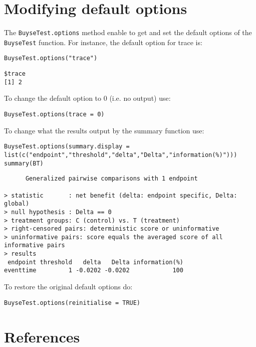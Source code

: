 \documentclass[12pt]{article}
\begin{document}
\clearpage

\section{Modifying default options}
\label{sec:org1e2e6ce}
The \texttt{BuyseTest.options} method enable to get and set the default
options of the \texttt{BuyseTest} function. For instance, the default option
for trace is:
\lstset{language=r,label= ,caption= ,captionpos=b,numbers=none}
\begin{lstlisting}
BuyseTest.options("trace")
\end{lstlisting}

\begin{verbatim}
$trace
[1] 2
\end{verbatim}

To change the default option to 0 (i.e. no output) use:
\lstset{language=r,label= ,caption= ,captionpos=b,numbers=none}
\begin{lstlisting}
BuyseTest.options(trace = 0)
\end{lstlisting}

To change what the results output by the summary function use:
\lstset{language=r,label= ,caption= ,captionpos=b,numbers=none}
\begin{lstlisting}
BuyseTest.options(summary.display = list(c("endpoint","threshold","delta","Delta","information(%)")))
summary(BT)
\end{lstlisting}

\begin{verbatim}
      Generalized pairwise comparisons with 1 endpoint

> statistic       : net benefit (delta: endpoint specific, Delta: global) 
> null hypothesis : Delta == 0 
> treatment groups: C (control) vs. T (treatment) 
> right-censored pairs: deterministic score or uninformative
> uninformative pairs: score equals the averaged score of all informative pairs
> results
 endpoint threshold   delta   Delta information(%)
eventtime         1 -0.0202 -0.0202            100
\end{verbatim}


To restore the original default options do:
\lstset{language=r,label= ,caption= ,captionpos=b,numbers=none}
\begin{lstlisting}
BuyseTest.options(reinitialise = TRUE)
\end{lstlisting}

\clearpage


\section*{References}
\label{sec:org765ee1e}
\begingroup
\renewcommand{\section}[2]{}




\endgroup
\end{document}
